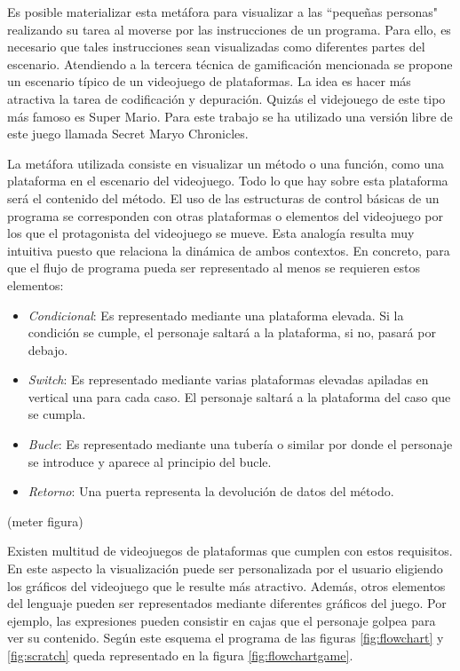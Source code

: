 \documentclass{llncs}
\begin{document}
Es posible materializar esta metáfora para visualizar a las ``pequeñas personas" realizando su tarea al moverse por las instrucciones de un programa. Para ello, es necesario que tales instrucciones sean visualizadas como diferentes partes del escenario. Atendiendo a la tercera técnica de gamificación mencionada se propone un escenario típico de un videojuego de plataformas. La idea es hacer más atractiva la tarea de codificación y depuración. Quizás el videjouego de este tipo más famoso es Super Mario. Para este trabajo se ha utilizado una versión libre de este juego llamada Secret Maryo Chronicles.

La metáfora utilizada consiste en visualizar un método o una función, como una plataforma en el escenario del videojuego. Todo lo que hay sobre esta plataforma será el contenido del método. El uso de las estructuras de control básicas de un programa se corresponden con otras plataformas o elementos del videojuego por los que el protagonista del videojuego se mueve. Esta analogía resulta muy intuitiva puesto que relaciona la dinámica de ambos contextos. En concreto, para que el flujo de programa pueda ser representado al menos se requieren estos elementos: 

\begin{itemize}
\item {\em Condicional}: Es representado mediante una plataforma elevada. Si la condición se cumple, el personaje saltará a la plataforma, si no, pasará por debajo.
\item {\em Switch}: Es representado mediante varias plataformas elevadas apiladas en vertical una para cada caso. El personaje saltará a la plataforma del caso que se cumpla.
\item {\em Bucle}: Es representado mediante una tubería o similar por donde el personaje se introduce y aparece al principio del bucle.
\item {\em Retorno}: Una puerta representa la devolución de datos del método.
\end{itemize}

(meter figura)

Existen multitud de videojuegos de plataformas que cumplen con estos requisitos. En este aspecto la visualización puede ser personalizada por el usuario eligiendo los gráficos del videojuego que le resulte más atractivo. Además, otros elementos del lenguaje pueden ser representados mediante diferentes gráficos del juego. Por ejemplo, las expresiones pueden consistir en cajas que el personaje golpea para ver su contenido. Según este esquema el programa de las figuras \ref{fig:flowchart} y \ref{fig:scratch} queda representado en la figura \ref{fig:flowchartgame}.
\end{document}

